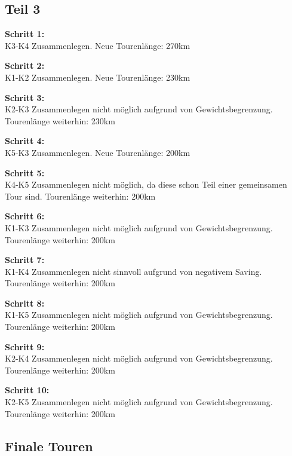 \documentclass[a4paper,11pt]{article}
\begin{document}
\subsection*{Teil 3}

\textbf{Schritt 1:} \\
K3-K4 Zusammenlegen. Neue Tourenlänge: 270km \newline

\textbf{Schritt 2:} \\
K1-K2 Zusammenlegen. Neue Tourenlänge: 230km \newline

\textbf{Schritt 3:} \\
K2-K3 Zusammenlegen nicht möglich aufgrund von Gewichtsbegrenzung. Tourenlänge weiterhin: 230km \newline

\textbf{Schritt 4:} \\
K5-K3 Zusammenlegen. Neue Tourenlänge: 200km \newline

\textbf{Schritt 5:} \\
K4-K5 Zusammenlegen nicht möglich, da diese schon Teil einer gemeinsamen Tour sind. Tourenlänge weiterhin: 200km \newline

\textbf{Schritt 6:} \\
K1-K3 Zusammenlegen nicht möglich aufgrund von Gewichtsbegrenzung. Tourenlänge weiterhin: 200km \newline

\textbf{Schritt 7:} \\
K1-K4 Zusammenlegen nicht sinnvoll aufgrund von negativem Saving. Tourenlänge weiterhin: 200km \newline

\textbf{Schritt 8:} \\
K1-K5 Zusammenlegen nicht möglich aufgrund von Gewichtsbegrenzung. Tourenlänge weiterhin: 200km \newline

\textbf{Schritt 9:} \\
K2-K4 Zusammenlegen nicht möglich aufgrund von Gewichtsbegrenzung. Tourenlänge weiterhin: 200km \newline

\textbf{Schritt 10:} \\
K2-K5 Zusammenlegen nicht möglich aufgrund von Gewichtsbegrenzung. Tourenlänge weiterhin: 200km \newline

\subsection*{Finale Touren}
\end{document}

